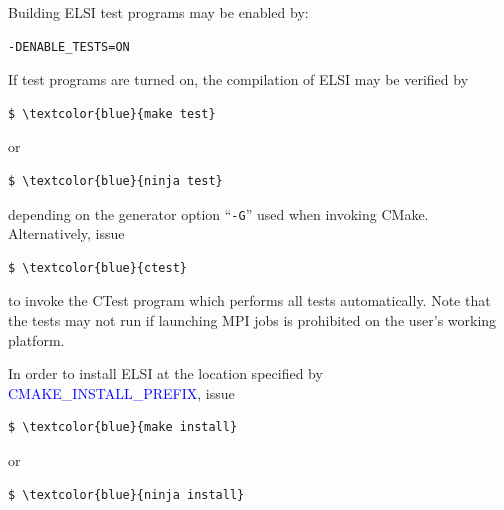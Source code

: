 \documentclass{report}
\begin{document}
Building ELSI test programs may be enabled by:
\begin{tcolorbox}
\begin{verbatim}
-DENABLE_TESTS=ON
\end{verbatim}
\end{tcolorbox}

If test programs are turned on, the compilation of ELSI may be verified by
\begin{tcolorbox}
\begin{Verbatim}[commandchars=\\\{\}]
$ \textcolor{blue}{make test}
\end{Verbatim}
\end{tcolorbox}

or
\begin{tcolorbox}
\begin{Verbatim}[commandchars=\\\{\}]
$ \textcolor{blue}{ninja test}
\end{Verbatim}
\end{tcolorbox}

depending on the generator option ``\verb+-G+'' used when invoking CMake. Alternatively, issue
\begin{tcolorbox}
\begin{Verbatim}[commandchars=\\\{\}]
$ \textcolor{blue}{ctest}
\end{Verbatim}
\end{tcolorbox}

to invoke the CTest program which performs all tests automatically. Note that the tests may not run if launching MPI jobs is prohibited on the user's working platform.

In order to install ELSI at the location specified by \textcolor{blue}{CMAKE\_INSTALL\_PREFIX}, issue
\begin{tcolorbox}
\begin{Verbatim}[commandchars=\\\{\}]
$ \textcolor{blue}{make install}
\end{Verbatim}
\end{tcolorbox}

or
\begin{tcolorbox}
\begin{Verbatim}[commandchars=\\\{\}]
$ \textcolor{blue}{ninja install}
\end{Verbatim}
\end{tcolorbox}
\end{document}
